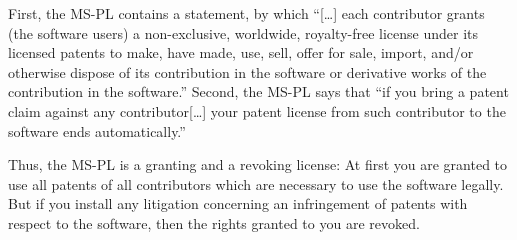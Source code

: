 First, the MS-PL contains a statement, by which \enquote{[\ldots] each 
contributor grants (the software users) a non-exclusive, worldwide, royalty-free 
license under its licensed patents to make, have made, use, sell, offer for 
sale, import, and/or otherwise dispose of its contribution in the software or 
derivative works of the contribution in the software.} Second,
the MS-PL says that \enquote{if you bring a patent claim against any
contributor[\ldots] your patent license from such contributor to the software
ends automatically.} 

Thus, the MS-PL is a granting and a revoking license: At first you are granted
to use all patents of all contributors which are necessary to use the software
legally. But if you install any litigation concerning an infringement of
patents with respect to the software, then the rights granted to you are revoked. 

% 


